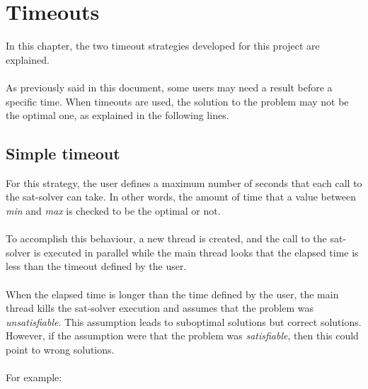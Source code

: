
\chapter{Timeouts} %

\label{Chapter5} %

In this chapter, the two timeout strategies developed for this project are explained.\\\\
As previously said in this document, some users may need a result before a specific time. When timeouts are used, the solution to the problem may not be the optimal one, as explained in the following lines.

\section{Simple timeout}
For this strategy, the user defines a maximum number of seconds that each call to the sat-solver can take. In other words, the amount of time that a value between \emph{min} and \emph{max} is checked to be the optimal or not. \\\\
To accomplish this behaviour, a new thread is created, and the call to the sat-solver is executed in parallel while the main thread looks that the elapsed time is less than the timeout defined by the user.  \\\\
When the elapsed time is longer than the time defined by the user, the main thread kills the sat-solver execution and assumes that the problem was \emph{unsatisfiable}. This assumption leads to suboptimal solutions but correct solutions. However, if the assumption were that the problem was \emph{satisfiable}, then this could point to wrong solutions. \\\\
For example:
